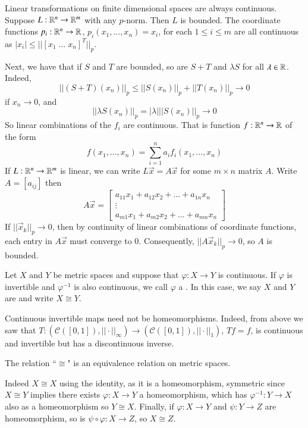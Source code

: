 \begin{example}
    Linear transformations on finite dimensional spaces are always continuous. Suppose $L:\mathbb R^n\rightarrow \mathbb R^m$ with any $p$-norm. Then $L$ is bounded. The coordinate functions $p_i:\mathbb R^n\rightarrow \mathbb R$, $p_i(x_1,...,x_n) = x_i$, for each $1 \leq i \leq m$ are all continuous as $|x_i| \leq ||[x_1\;...\;x_n]^T||_p$. 

    Next, we have that if $S$ and $T$ are bounded, so are $S+T$ and $\lambda S$ for all $\lambda \in \mathbb R$. Indeed, $$||(S+T)(x_n)||_p \leq ||S(x_n)||_p+||T(x_n)||_p\rightarrow 0$$ if $x_n\rightarrow 0$, and $$||\lambda S(x_n)||_p = |\lambda |||S(x_n)||_p\rightarrow 0$$ So linear combinations of the $f_i$ are continuous. That is function $f:\mathbb R^n\rightarrow \mathbb R$ of the form $$f(x_1,...,x_n) = \sum_{i=1}^na_if_i(x_1,...,x_n)$$ If $L:\mathbb R^n\rightarrow \mathbb R^m$ is linear, we can write $L\vec{x} = A\vec{x}$ for some $m\times n$ matrix $A$. Write $A = [a_{ij}]$ then $$A\vec{x} = \begin{bmatrix} a_{11}x_1+a_{12}x_2+...+a_{1n}x_n \\ \vdots \\ a_{m1}x_1+a_{m2}x_2 + ... + a_{mn}x_n\end{bmatrix}$$ If $||\vec{x}_k||_p\rightarrow 0$, then by continuity of linear combinations of coordinate functions, each entry in $A\vec{x}$ must converge to $0$. Consequently, $||A\vec{x}_k||_p\rightarrow 0$, so $A$ is bounded.
\end{example}


\begin{definition}
     Let $X$ and $Y$ be metric spaces and suppose that $\varphi:X\rightarrow Y$ is continuous. If $\varphi$ is invertible and $\varphi^{-1}$ is also continuous, we call $\varphi$ a . In this case, we say $X$ and $Y$ are  and write $X\cong Y$.
\end{definition}

\begin{example}
    Continuous invertible maps need not be homeomorphisms. Indeed, from above we saw that $T:(\mathcal{C}([0,1]),||\cdot||_{\infty})\rightarrow (\mathcal{C}([0,1]),||\cdot||_1)$, $Tf= f$, is continuous and invertible but has a discontinuous inverse.
\end{example}

\begin{proposition}
    The relation ``$\cong$" is an equivalence relation on metric spaces.
\end{proposition}
Indeed $X\cong X$ using the identity, as it is a homeomorphism, symmetric since $X\cong Y$ implies there exists $\varphi:X\rightarrow Y$ a homeomorphism, which has $\varphi^{-1}:Y\rightarrow X$ also as a homeomorphism so $Y\cong X$. Finally, if $\varphi:X\rightarrow Y$ and $\psi:Y\rightarrow Z$ are homeomorphism, so is $\psi\circ\varphi:X\rightarrow Z$, so $X\cong Z$.

